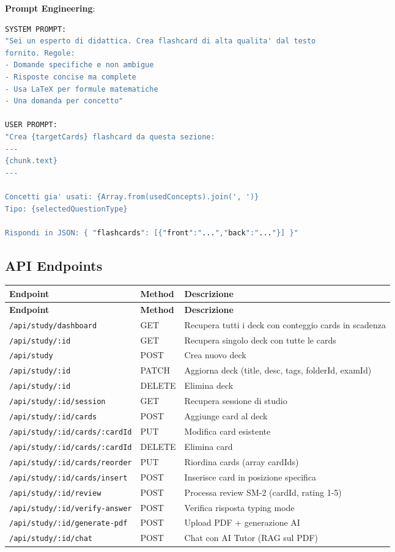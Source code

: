 \documentclass[11pt,a4paper]{article}
\begin{document}
\textbf{Prompt Engineering}:
\begin{lstlisting}[language=bash]
SYSTEM PROMPT:
"Sei un esperto di didattica. Crea flashcard di alta qualita' dal testo 
fornito. Regole:
- Domande specifiche e non ambigue
- Risposte concise ma complete  
- Usa LaTeX per formule matematiche
- Una domanda per concetto"

USER PROMPT:
"Crea {targetCards} flashcard da questa sezione:
---
{chunk.text}
---

Concetti gia' usati: {Array.from(usedConcepts).join(', ')}
Tipo: {selectedQuestionType}

Rispondi in JSON: { "flashcards": [{"front":"...","back":"..."}] }"
\end{lstlisting}

\subsection{API Endpoints}\label{subsec:api-endpoints}

\begin{longtable}{|p{4cm}|p{1.5cm}|p{8cm}|}
\hline
\textbf{Endpoint} & \textbf{Method} & \textbf{Descrizione} \\
\hline
\endfirsthead
\hline
\textbf{Endpoint} & \textbf{Method} & \textbf{Descrizione} \\
\hline
\endhead
\texttt{/api/study/dashboard} & GET & Recupera tutti i deck con conteggio cards in scadenza \\
\hline
\texttt{/api/study/:id} & GET & Recupera singolo deck con tutte le cards \\
\hline
\texttt{/api/study} & POST & Crea nuovo deck \\
\hline
\texttt{/api/study/:id} & PATCH & Aggiorna deck (title, desc, tags, folderId, examId) \\
\hline
\texttt{/api/study/:id} & DELETE & Elimina deck \\
\hline
\texttt{/api/study/:id/session} & GET & Recupera sessione di studio \\
\hline
\texttt{/api/study/:id/cards} & POST & Aggiunge card al deck \\
\hline
\texttt{/api/study/:id/cards/:cardId} & PUT & Modifica card esistente \\
\hline
\texttt{/api/study/:id/cards/:cardId} & DELETE & Elimina card \\
\hline
\texttt{/api/study/:id/cards/reorder} & PUT & Riordina cards (array cardIds) \\
\hline
\texttt{/api/study/:id/cards/insert} & POST & Inserisce card in posizione specifica \\
\hline
\texttt{/api/study/:id/review} & POST & Processa review SM-2 (cardId, rating 1-5) \\
\hline
\texttt{/api/study/:id/verify-answer} & POST & Verifica risposta typing mode \\
\hline
\texttt{/api/study/:id/generate-pdf} & POST & Upload PDF + generazione AI \\
\hline
\texttt{/api/study/:id/chat} & POST & Chat con AI Tutor (RAG sul PDF) \\
\hline
\end{longtable}
\end{document}
